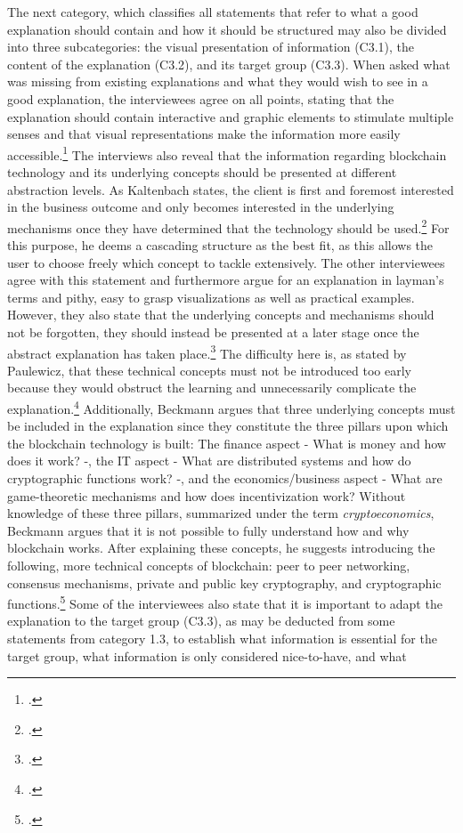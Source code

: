 The next category, which classifies all statements that refer to what a good explanation should contain and how it should be structured may also be divided into three subcategories: the visual presentation of information (C3.1), the content of the explanation (C3.2), and its target group (C3.3). When asked what was missing from existing explanations and what they would wish to see in a good explanation, the interviewees agree on all points, stating that the explanation should contain interactive and graphic elements to stimulate multiple senses and that visual representations make the information more easily accessible.\footcites[Cf.][P39, P40, P42]{DanielKaltenbach_Interview}[cf.][P82, P83, P84]{BjoernPaulewicz_Interview}[cf.][P123, P124, P134]{RalphBeckmann_Interview} The interviews also reveal that the information regarding blockchain technology and its underlying concepts should be presented at different abstraction levels. As Kaltenbach states, the client is first and foremost interested in the business outcome and only becomes interested in the underlying mechanisms once they have determined that the technology should be used.\footcites[Cf.][P29, P30, P31, P32]{DanielKaltenbach_Interview} For this purpose, he deems a cascading structure as the best fit, as this allows the user to choose freely which concept to tackle extensively. The other interviewees agree with this statement and furthermore argue for an explanation in layman's terms and pithy, easy to grasp visualizations as well as practical examples. However, they also state that the underlying concepts and mechanisms should not be forgotten, they should instead be presented at a later stage once the abstract explanation has taken place.\footcites[Cf.][P51, P52, P55, P56]{DanielKaltenbach_Interview}[cf.][P78, P85, P86]{BjoernPaulewicz_Interview}[cf.][P125, P128]{RalphBeckmann_Interview} The difficulty here is, as stated by Paulewicz, that these technical concepts must not be introduced too early because they would obstruct the learning and unnecessarily complicate the explanation.\footcites[Cf.][P88, P89]{BjoernPaulewicz_Interview} Additionally, Beckmann argues that three underlying concepts must be included in the explanation since they constitute the three pillars upon which the blockchain technology is built: The finance aspect - What is money and how does it work? -, the \ac{IT} aspect - What are distributed systems and how do cryptographic functions work? -, and the economics/business aspect - What are game-theoretic mechanisms and how does incentivization work? Without knowledge of these three pillars, summarized under the term \textit{cryptoeconomics}, Beckmann argues that it is not possible to fully understand how and why blockchain works. After explaining these concepts, he suggests introducing the following, more technical concepts of blockchain: peer to peer networking, consensus mechanisms, private and public key cryptography, and cryptographic functions.\footcites[Cf.][P126, P132]{RalphBeckmann_Interview} Some of the interviewees also state that it is important to adapt the explanation to the target group (C3.3), as may be deducted from some statements from category 1.3, to establish what information is essential for the target group, what information is only considered nice-to-have, and what 